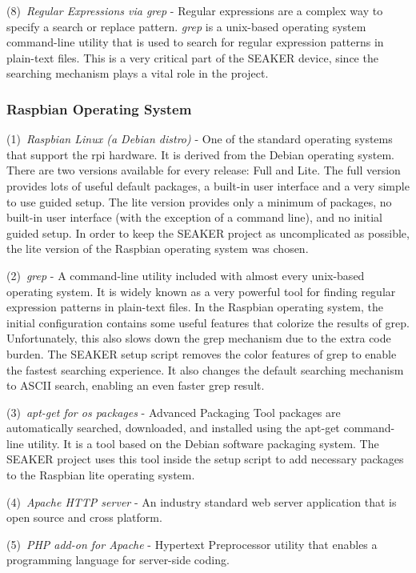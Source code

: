\documentclass[12pt]{article}
\begin{document}
(8)~{\em Regular Expressions via grep} - Regular expressions are
a complex way to specify a search or replace pattern.  {\em grep}
is a unix-based operating system command-line utility that is
used to search for regular expression patterns in plain-text
files.  This is a very critical part of the SEAKER device, since
the searching mechanism plays a vital role in the project.

\subsubsection {Raspbian Operating System}

(1)~{\em Raspbian Linux (a Debian distro)} - One of the standard
operating systems that support the \gls{rpi} hardware.  It is
derived from the Debian operating system.  There are two versions
available for every release: Full and Lite.  The full version
provides lots of useful default packages, a built-in user interface
and a very simple to use guided setup.  The lite version provides
only a minimum of packages, no built-in user interface (with the
exception of a command line), and no initial guided setup.  In
order to keep the SEAKER project as uncomplicated as possible, 
the lite version of the Raspbian operating system was chosen.

(2)~{\em grep} - A command-line utility included
with almost every unix-based operating system.  It is widely
known as a very powerful tool for finding regular expression
patterns in plain-text files.  In the Raspbian operating system,
the initial configuration contains some useful features that
colorize the results of grep.  Unfortunately, this also slows
down the grep mechanism due to the extra code burden.  The
SEAKER setup script removes the color features of grep to 
enable the fastest searching experience.  It also changes the
default searching mechanism to ASCII search,
enabling an even faster grep result.

(3)~{\em apt-get for os packages} - Advanced Packaging Tool
packages are automatically searched, downloaded, and installed
using the apt-get command-line utility.  It is a tool based
on the Debian software packaging system.  The SEAKER project
uses this tool inside the setup script to add necessary
packages to the Raspbian lite operating system.

(4)~{\em Apache HTTP server} - An industry standard web
server application that is open source and cross platform.

(5)~{\em PHP add-on for Apache} - Hypertext Preprocessor utility
that enables a programming language for server-side coding.
\end{document}
